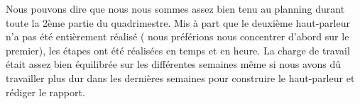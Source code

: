 Nous pouvons dire que nous nous sommes assez bien tenu au planning durant toute la 2ème partie du quadrimestre. 
Mis à part que le deuxième haut-parleur n'a pas été entièrement réalisé ( nous préférions nous concentrer d'abord sur 
le premier), les étapes ont été réalisées en temps et en heure.  La charge de travail était assez bien équilibrée sur 
les différentes semaines même si nous avons dû travailler plus dur dans les dernières semaines pour construire le haut-parleur
et rédiger le rapport.


